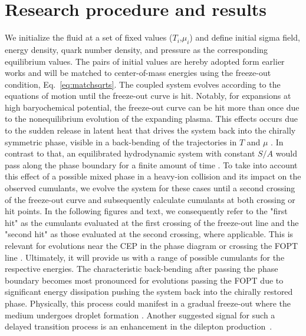 \documentclass[%
 reprint,
 amsmath,amssymb,
 aps,
]{revtex4-2}
\begin{document}
\section{Research procedure and results}
\label{sec:results}

We initialize the fluid at a set of fixed values ($T_i$,$\mu_i$) and define initial sigma field, energy density, quark number density, and pressure as the corresponding equilibrium values. The pairs of initial values are hereby adopted form earlier works \cite{Herold:2018ptm,Herold:2022tki} and will be matched to center-of-mass energies using the freeze-out condition, Eq.~\eqref{eq:matchsqrts}. The coupled system evolves according to the equations of motion until the freeze-out curve is hit. Notably, for expansions at high baryochemical potential, the freeze-out curve can be hit more than once due to the nonequilibrium evolution of the expanding plasma. This effects occurs due to the sudden release in latent heat that drives the system back into the chirally symmetric phase, visible in a back-bending of the trajectories in $T$ and $\mu$ \cite{Herold:2013qda,Herold:2018ptm}. In contrast to that, an equilibrated hydrodynamic system with constant $S/A$ would pass along the phase boundary for a finite amount of time \cite{Steinheimer:2007iy}. To take into account this effect of a possible mixed phase in a heavy-ion collision and its impact on the observed cumulants, we evolve the system for these cases until a second crossing of the freeze-out curve and subsequently calculate cumulants at both crossing or hit points. In the following figures and text, we consequently refer to the "first hit" as the cumulants evaluated at the first crossing of the freeze-out line and the "second hit" as those evaluated at the second crossing, where applicable. This is relevant for evolutions near the CEP in the phase diagram or crossing the FOPT line \cite{Herold:2022tki}. Ultimately, it will provide us with a range of possible cumulants for the respective energies. The characteristic back-bending after passing the phase boundary becomes most pronounced for evolutions passing the FOPT due to significant energy dissipation pushing the system back into the chirally restored phase. Physically, this process could manifest in a gradual freeze-out where the medium undergoes droplet formation \cite{Randrup:2009gp,Mishustin:1998eq}. Another suggested signal for such a delayed transition process is an enhancement in the dilepton production~\cite{Seck:2020qbx}. 
\end{document}
